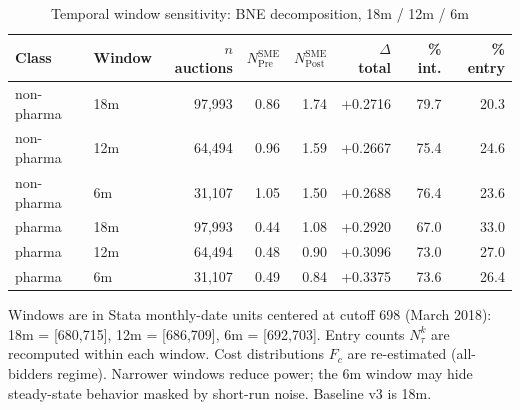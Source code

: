 \begin{table}[htbp]
\centering
\begin{threeparttable}
\caption{Temporal window sensitivity: BNE decomposition, 18m / 12m / 6m}
\label{tab:v3_window_sensitivity}
\small
\begin{tabular}{llrrrrrr}
\toprule
Class & Window & $n$ auctions & $N^{\text{SME}}_{\text{Pre}}$ & $N^{\text{SME}}_{\text{Post}}$ & $\Delta$ total & \% int. & \% entry \\
\midrule
non-pharma & 18m & 97,993 & 0.86 & 1.74 & +0.2716 & 79.7 & 20.3 \\
non-pharma & 12m & 64,494 & 0.96 & 1.59 & +0.2667 & 75.4 & 24.6 \\
non-pharma & 6m & 31,107 & 1.05 & 1.50 & +0.2688 & 76.4 & 23.6 \\
pharma & 18m & 97,993 & 0.44 & 1.08 & +0.2920 & 67.0 & 33.0 \\
pharma & 12m & 64,494 & 0.48 & 0.90 & +0.3096 & 73.0 & 27.0 \\
pharma & 6m & 31,107 & 0.49 & 0.84 & +0.3375 & 73.6 & 26.4 \\
\bottomrule
\end{tabular}
\begin{tablenotes}\footnotesize
\item Windows are in Stata monthly-date units centered at cutoff
698 (March 2018): 18m = [680,715], 12m = [686,709], 6m = [692,703].
Entry counts $N^k_\tau$ are recomputed within each window. Cost
distributions $F_c$ are re-estimated (all-bidders regime). Narrower
windows reduce power; the 6m window may hide steady-state behavior
masked by short-run noise. Baseline v3 is 18m.
\end{tablenotes}
\end{threeparttable}
\end{table}

